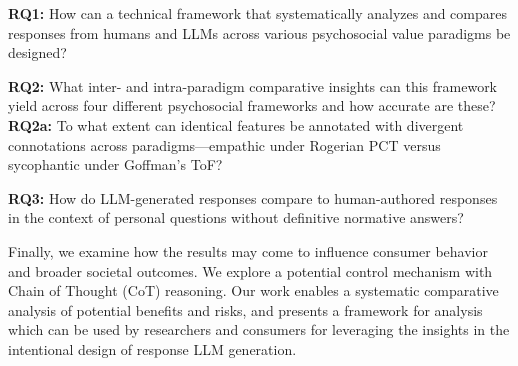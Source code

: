\medskip\textbf{RQ1:} How can a technical framework that systematically analyzes and compares responses from humans and LLMs across various psychosocial value paradigms be designed?  

\medskip\textbf{RQ2:} What inter- and intra-paradigm comparative insights can this framework yield across four different psychosocial frameworks and how accurate are these?
\textbf{RQ2a:} To what extent can identical features be annotated with divergent connotations across paradigms—empathic under Rogerian PCT versus sycophantic under Goffman’s ToF?

\medskip\textbf{RQ3:} How do LLM-generated responses compare to human-authored responses in the context of personal questions without definitive normative answers?

Finally, we examine how the results may come to influence consumer behavior and broader societal outcomes. We explore a potential control mechanism with Chain of Thought (CoT) reasoning. Our work enables a systematic comparative analysis of potential benefits and risks, and presents a framework for analysis which can be used by researchers and consumers for leveraging the insights in the intentional design of response LLM generation.






